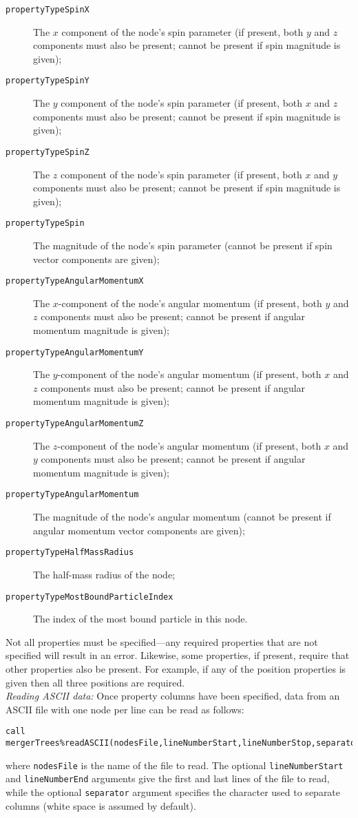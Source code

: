 \begin{description}
 \item [{\tt propertyTypeSpinX}] The $x$ component of the node's spin parameter (if present, both $y$ and $z$ components must also be present; cannot be present if spin magnitude is given);
 \item [{\tt propertyTypeSpinY}] The $y$ component of the node's spin parameter (if present, both $x$ and $z$ components must also be present; cannot be present if spin magnitude is given);
 \item [{\tt propertyTypeSpinZ}] The $z$ component of the node's spin parameter (if present, both $x$ and $y$ components must also be present; cannot be present if spin magnitude is given);
 \item [{\tt propertyTypeSpin}] The magnitude of the node's spin parameter (cannot be present if spin vector components are given);          
 \item [{\tt propertyTypeAngularMomentumX}] The $x$-component of the node's angular momentum (if present, both $y$ and $z$ components must also be present; cannot be present if angular momentum magnitude is given);
 \item [{\tt propertyTypeAngularMomentumY}] The $y$-component of the node's angular momentum (if present, both $x$ and $z$ components must also be present; cannot be present if angular momentum magnitude is given);
 \item [{\tt propertyTypeAngularMomentumZ}] The $z$-component of the node's angular momentum (if present, both $x$ and $y$ components must also be present; cannot be present if angular momentum magnitude is given);
 \item [{\tt propertyTypeAngularMomentum}] The magnitude of the node's angular momentum (cannot be present if angular momentum vector components are given);
 \item [{\tt propertyTypeHalfMassRadius}] The half-mass radius of the node;
 \item [{\tt propertyTypeMostBoundParticleIndex}] The index of the most bound particle in this node.
\end{description}
Not all properties must be specified---any required properties that are not specified will result in an error. Likewise, some properties, if present, require that other properties also be present. For example, if any of the position properties is given then all three positions are required.\\

\noindent \emph{Reading ASCII data:} Once property columns have been specified, data from an ASCII file with one node per line can be read as follows:
\begin{verbatim}
call mergerTrees%readASCII(nodesFile,lineNumberStart,lineNumberStop,separator=",")
\end{verbatim}
where {\tt nodesFile} is the name of the file to read. The optional {\tt lineNumberStart} and {\tt lineNumberEnd} arguments give the first and last lines of the file to read, while the optional {\tt separator} argument specifies the character used to separate columns (white space is assumed by default).\\

